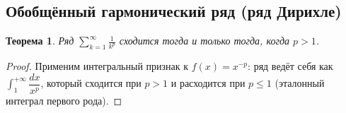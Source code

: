 \documentclass[11pt,a4paper]{article}
\theoremstyle{definition}
\theoremstyle{plain}
\newtheorem{theorem}[definition]{Теорема}
\renewcommand{\le}{\leqslant}
\begin{document}
\subsection{Обобщённый гармонический ряд (ряд Дирихле)}

\begin{theorem}
Ряд $\displaystyle\sum_{k=1}^\infty\frac1{k^p}$ сходится тогда и только тогда, когда $p>1$.
\end{theorem}

\begin{proof}
Применим интегральный признак к $f(x)=x^{-p}$: ряд ведёт себя как
$\int_1^{+\infty}\dfrac{dx}{x^p}$, который сходится при $p>1$ и расходится при $p\le1$ (эталонный
интеграл первого рода).
\end{proof}
\end{document}
